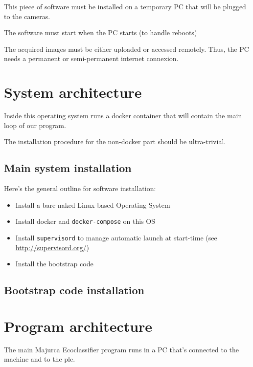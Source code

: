 This piece of software must be installed on a temporary PC that will be plugged to the cameras.

The software must start when the PC starts (to handle reboots)

The acquired images must be either uploaded or accessed remotely. Thus, the PC needs a permanent or semi-permanent internet connexion.

\section{System architecture}

Inside this operating system runs a \gls{docker} container that will contain the main loop of our program.

The installation procedure for the non-docker part should be ultra-trivial.

\subsection{Main system installation}

Here's the general outline for software installation:

\begin{itemize}
    \item Install a bare-naked Linux-based Operating System
    \item Install \gls{docker} and \texttt{docker-compose} on this OS
    \item Install \texttt{supervisord} to manage automatic launch at start-time (see \url{http://supervisord.org/})
    \item Install the bootstrap code
\end{itemize}

\subsection{Bootstrap code installation}



\section{Program architecture}

The main Majurca Ecoclassifier program runs in a PC that's connected to the machine and to the \gls{plc}.


